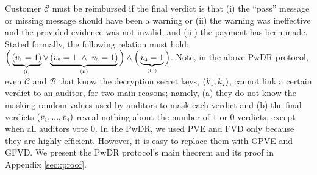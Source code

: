 Customer $\mathcal{C}$ must be reimbursed if the final verdict is that (i)  the ``pass'' message or  missing message should have been a warning or (ii)  the warning was ineffective and the provided evidence was not invalid, and (iii) the payment has been made. Stated formally, the following relation must hold: $\Big( \underbrace{(v_{\scriptscriptstyle 1}=1)}_{\scriptscriptstyle (\text{i})}\vee  \underbrace{(v_{\scriptscriptstyle 2}=1\ \wedge\ v_{\scriptscriptstyle 3}=1)}_{\scriptscriptstyle (\text {ii})}\Big)\wedge\Big(\underbrace{v_{\scriptscriptstyle 4}=1}_{\scriptscriptstyle (\text{iii})}\Big)$.
%
%
%
%
%
Note, in the above PwDR protocol, even $\mathcal{C}$ and $\mathcal{B}$ that know the decryption secret keys, $(\bar k_{\scriptscriptstyle 1}, \bar k_{\scriptscriptstyle 2})$, cannot link a certain verdict to an auditor, for two main reasons; namely,  (a) they do not know the masking random values used by auditors to mask each verdict and (b) the final verdicts $(v_{\scriptscriptstyle 1},..., v_{\scriptscriptstyle 4})$ reveal nothing about the number of $1$ or $0$ verdicts, except when all auditors vote $0$.   In the PwDR, we used PVE and FVD only because they are highly efficient. However, it is easy to replace them with GPVE and GFVD. We present the PwDR protocol's main theorem and its proof in Appendix \ref{sec::proof}.  




